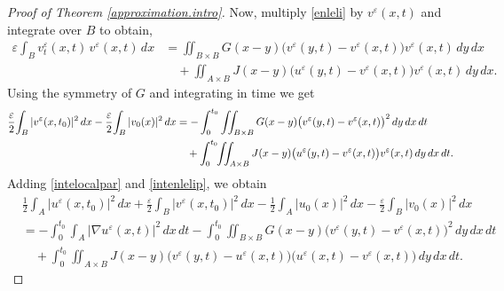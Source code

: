 \documentclass[reqno]{amsart}
\numberwithin{equation}{section}
\begin{document}
\begin{proof}[Proof of Theorem \ref{approximation.intro}]
Now, multiply \eqref{enleli} by $v^\varepsilon(x,t)$ and integrate over $B$ to obtain,
\begin{align*}
\varepsilon\!\int_B v_t^\varepsilon(x,t)\,v^\varepsilon(x,t)\,dx
&=
\iint_{B\times B}
 G(x-y)\big( v^\varepsilon(y,t)-v^\varepsilon(x,t) \big)
 v^\varepsilon(x,t)\,dy\,dx
\\
&\quad
+\iint_{A\times B}
 J(x-y)\big( u^\varepsilon(y,t)-v^\varepsilon(x,t) \big)
 v^\varepsilon(x,t)\,dy\,dx.
\end{align*}
Using the symmetry of $G$ and integrating in time we get
\begin{align}\label{intenlelip}
\frac{\varepsilon}{2}\!\int_B |v^\varepsilon(x,{t_0})|^2\,dx
-\frac{\varepsilon}{2}\!\int_B |v_0(x)|^2\,dx
&=
-\int_0^{t_0} \iint_{B\times B}
 G(x-y)\big( v^\varepsilon(y,t)-v^\varepsilon(x,t) \big)^2
\,dy\,dx\,dt
\notag\\
&\quad
+\int_0^{t_0}\!\!\iint_{A\times B}
 J(x-y)\big( u^\varepsilon(y,t)-v^\varepsilon(x,t) \big)
 v^\varepsilon(x,t)\,dy\,dx\,dt.
\end{align}
Adding \eqref{intelocalpar} and \eqref{intenlelip}, we obtain
\begin{align*}
&\frac12\!\int_A |u^\varepsilon(x,{t_0})|^2\,dx
+\frac{\varepsilon}{2}\!\int_B |v^\varepsilon(x,{t_0})|^2\,dx
-\frac12\!\int_A |u_0(x)|^2\,dx
-\frac{\varepsilon}{2}\!\int_B |v_0(x)|^2\,dx
\\[0.4em]
&=
-\int_0^{t_0}\!\!\int_A |\nabla u^\varepsilon(x,t)|^2\,dx\,dt
-\int_0^{t_0}\!\!\iint_{B\times B}
   G(x-y)\big( v^\varepsilon(y,t)-v^\varepsilon(x,t) \big)^2
\,dy\,dx\,dt
\\
&\quad
+\int_0^{t_0}\!\!\iint_{A\times B}
 J(x-y)\big( v^\varepsilon(y,t)-u^\varepsilon(x,t) \big)
 \big( u^\varepsilon(x,t)-v^\varepsilon(x,t) \big)
\,dy\,dx\,dt.
\end{align*}


\end{proof}
\end{document}
